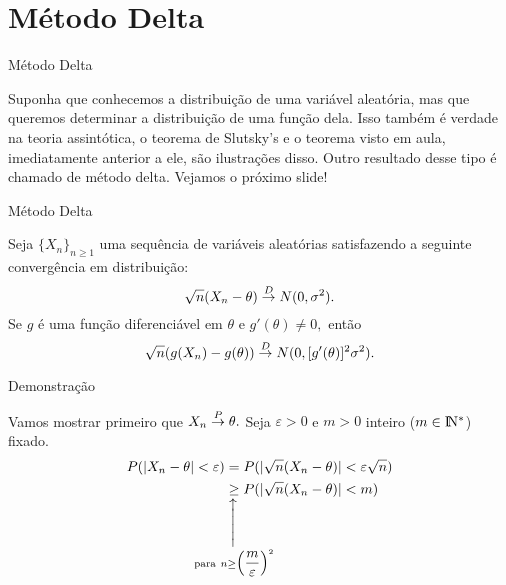 \documentclass[12pt]{beamer}
\begin{document}
\section{Método Delta}
\begin{frame}{Método Delta}
\begin{block}{}
\justifying
Suponha que conhecemos a distribuição de uma variável aleatória, mas que queremos determinar a distribuição de uma função dela. Isso também é verdade na teoria assintótica, o teorema de Slutsky's e o teorema visto em aula, imediatamente anterior a ele, são ilustrações disso. Outro resultado desse tipo é chamado de método delta. Vejamos o próximo slide!
\end{block}
\end{frame}


\begin{frame}{Método Delta}
\begin{Teorema}
\justifying
Seja $\{X_{n}\}_{n\geq 1}$ uma sequência de variáveis aleatórias satisfazendo a seguinte convergência em distribuição:
$$\sqrt{n}(X_{n}-\theta)\overset{D}{\rightarrow} N(0,\sigma^{2}).$$ Se $g$ é uma função diferenciável em $\theta$ e $g'(\theta)\neq 0,$ então $$\sqrt{n}(g(X_{n})-g(\theta))\overset{D}{\rightarrow} N(0, [g'(\theta)]^{2}\sigma^{2}).$$
\end{Teorema}
\end{frame}

\begin{frame}{Demonstração}
\begin{block}{}
\justifying
Vamos mostrar primeiro que $X_{n}\overset{P}{\rightarrow} \theta.$ Seja $\varepsilon>0$ e $m>0$ inteiro ($m\in \rm I\!N^{*}$) fixado. 
\begin{align*}
    P(|X_{n}-\theta|<\varepsilon)&=P(|\sqrt{n}(X_{n}-\theta)|<\varepsilon\sqrt{n})\\
    &\SetaUP{\text{para}~n\geq \Big(\dfrac{m}{\varepsilon}\Big)^{2}}{\geq} P(|\sqrt{n}(X_{n}-\theta)|<m)
\end{align*}
\end{block}
\end{frame}
\end{document}
